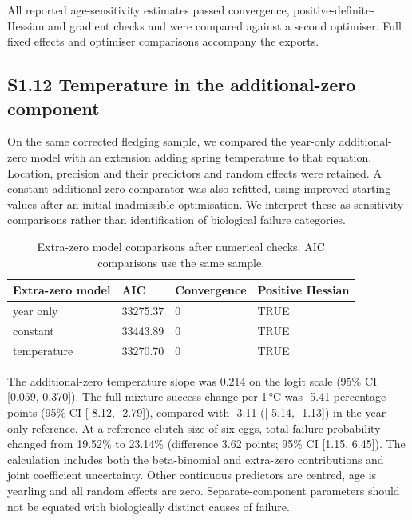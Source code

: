 \documentclass{article}
\begin{document}
All reported age-sensitivity estimates passed convergence, positive-definite-Hessian and gradient checks and were compared against a second optimiser. Full fixed effects and optimiser comparisons accompany the exports.

\subsection{S1.12 Temperature in the additional-zero component}

On the same corrected fledging sample, we compared the year-only additional-zero model with an extension adding spring temperature to that equation. Location, precision and their predictors and random effects were retained. A constant-additional-zero comparator was also refitted, using improved starting values after an initial inadmissible optimisation. We interpret these as sensitivity comparisons rather than identification of biological failure categories.

\begin{table}[!ht]\centering\scriptsize\singlespacing
\caption{Extra-zero model comparisons after numerical checks. AIC comparisons use the same sample.}\label{tab:extra-zero-comparison}
\begin{tabular}{llll}\toprule
Extra-zero model & AIC & Convergence & Positive Hessian\\\midrule
year only & 33275.37 & 0 & TRUE\\
constant & 33443.89 & 0 & TRUE\\
temperature & 33270.70 & 0 & TRUE\\
\bottomrule\end{tabular}\end{table}
The additional-zero temperature slope was 0.214 on the logit scale (95\% CI [0.059, 0.370]). The full-mixture success change per 1\,\si{\degreeCelsius} was -5.41 percentage points (95\% CI [-8.12, -2.79]), compared with -3.11 ([-5.14, -1.13]) in the year-only reference. At a reference clutch size of six eggs, total failure probability changed from 19.52\% to 23.14\% (difference 3.62 points; 95\% CI [1.15, 6.45]). The calculation includes both the beta-binomial and extra-zero contributions and joint coefficient uncertainty. Other continuous predictors are centred, age is yearling and all random effects are zero. Separate-component parameters should not be equated with biologically distinct causes of failure.
\end{document}
